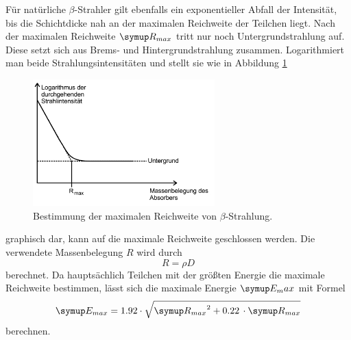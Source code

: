 Für natürliche $\beta$-Strahler gilt ebenfalls ein exponentieller Abfall der
Intensität, bis die Schichtdicke nah an der maximalen Reichweite der Teilchen liegt.
Nach der maximalen Reichweite $\su{R_{max}}$ tritt nur noch Untergrundstrahlung auf.
Diese setzt sich aus Brems- und Hintergrundstrahlung zusammen. Logarithmiert man
beide Strahlungsintensitäten und stellt sie wie in Abbildung \ref{fig:reich}
\newpage
\begin{figure}
  \includegraphics[width=7cm]{bilder/betaabsorp.jpg}
  \caption{Bestimmung der maximalen Reichweite von $\beta$-Strahlung.\cite{704}}
  \label{fig:reich}
\end{figure}
graphisch dar, kann auf die maximale Reichweite geschlossen werden. Die verwendete
Massenbelegung $R$ wird durch
\begin{equation}
  R=\rho D
\end{equation}
berechnet. Da hauptsächlich Teilchen mit der größten Energie die maximale Reichweite
bestimmen, lässt sich die maximale Energie $\su{E_max}$ mit Formel
\begin{equation}
  \su{E_{max}} = 1.92 \cdot\sqrt{\su{R_{max}}^2+0.22\,\cdot\su{R_{max}}}
  \label{eqn:emax}
\end{equation}
berechnen.
